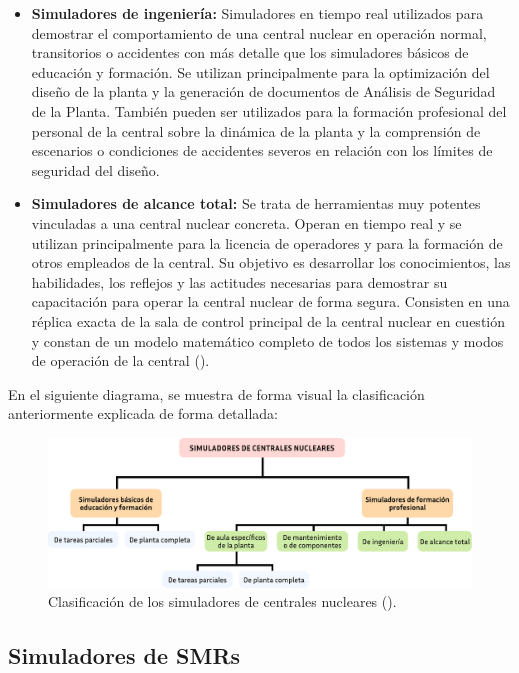 \begin{enumerate}
\begin{itemize}
    \item \textbf{Simuladores de ingeniería:} Simuladores en tiempo real utilizados para demostrar el comportamiento de una central nuclear en operación normal, transitorios o accidentes con más detalle que los simuladores básicos de educación y formación. Se utilizan principalmente para la optimización del diseño de la planta y la generación de documentos de Análisis de Seguridad de la Planta. También pueden ser utilizados para la formación profesional del personal de la central sobre la dinámica de la planta y la comprensión de escenarios o condiciones de accidentes severos en relación con los límites de seguridad del diseño.
    \item \textbf{Simuladores de alcance total:} Se trata de herramientas muy potentes vinculadas a una central nuclear concreta. Operan en tiempo real y se utilizan principalmente para la licencia de operadores y para la formación de otros empleados de la central. Su objetivo es desarrollar los conocimientos, las habilidades, los reflejos y las actitudes necesarias para demostrar su capacitación para operar la central nuclear de forma segura. Consisten en una réplica exacta de la sala de control principal de la central nuclear en cuestión y constan de un modelo matemático completo de todos los sistemas y modos de operación de la central (\cite{international2019iaea}).
  \end{itemize}
\end{enumerate}

En el siguiente diagrama, se muestra de forma visual la clasificación anteriormente explicada de forma detallada:

\begin{figure}[h]
  \centering
  \includegraphics[width=\textwidth]{content/figures/clasificacion_simuladores.pdf}
  \caption{Clasificación de los simuladores de centrales nucleares (\cite{international2019iaea}).}
  \label{fig:clasificacion_simuladores}
\end{figure}

\subsection{Simuladores de SMRs}

